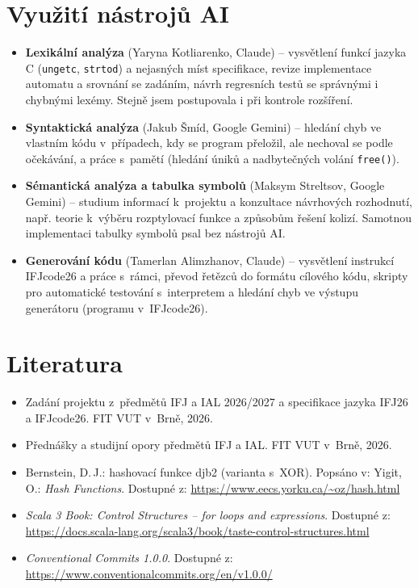 \documentclass[11pt,a4paper]{article}
\begin{document}
\section{Využití nástrojů AI}

\begin{itemize}
  \item \textbf{Lexikální analýza} (Yaryna Kotliarenko, Claude) --
        vysvětlení funkcí jazyka C (\texttt{ungetc}, \texttt{strtod})
        a nejasných míst specifikace, revize implementace automatu
        a srovnání se zadáním, návrh regresních testů se správnými
        i chybnými lexémy. Stejně jsem postupovala
        i při kontrole rozšíření.
          \item \textbf{Syntaktická analýza} (Jakub Šmíd, Google Gemini) --
        hledání chyb ve vlastním kódu v~případech, kdy se program
        přeložil, ale nechoval se podle očekávání, a práce s~pamětí
        (hledání úniků a nadbytečných volání \texttt{free()}).
         \item   \textbf{Sémantická analýza a tabulka symbolů} (Maksym Streltsov,
        Google Gemini) -- studium informací k~projektu a konzultace
        návrhových rozhodnutí, např. teorie k~výběru rozptylovací funkce
        a způsobům řešení kolizí. Samotnou implementaci tabulky symbolů
        psal bez nástrojů AI.
        
           \item \textbf{Generování kódu} (Tamerlan Alimzhanov, Claude) --
        vysvětlení instrukcí IFJcode26 a práce s~rámci, převod řetězců
        do formátu cílového kódu, skripty pro automatické testování
        s~interpretem a hledání chyb ve výstupu generátoru (programu
        v~IFJcode26).
\end{itemize}


\section*{Literatura}
\begin{itemize}
  \item Zadání projektu z~předmětů IFJ a IAL 2026/2027 a specifikace
        jazyka IFJ26 a IFJcode26. FIT VUT v~Brně, 2026.
  \item Přednášky a studijní opory předmětů IFJ a IAL. FIT VUT v~Brně,
        2026.
  \item Bernstein, D.\,J.: hashovací funkce djb2 (varianta s~XOR).
        Popsáno v: Yigit, O.: \emph{Hash Functions}. Dostupné z:
        \url{https://www.eecs.yorku.ca/~oz/hash.html}
  \item \emph{Scala 3 Book: Control Structures -- for loops and
        expressions}. Dostupné z:
        \url{https://docs.scala-lang.org/scala3/book/taste-control-structures.html}
  \item \emph{Conventional Commits 1.0.0}. Dostupné z:
        \url{https://www.conventionalcommits.org/en/v1.0.0/}
\end{itemize}
\end{document}
